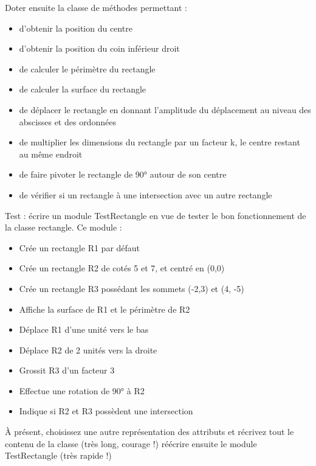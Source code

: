 {
Doter ensuite la classe de méthodes permettant :}

\liststyleListi
\begin{itemize}
\item {
d’obtenir la position du centre}
\item {
d’obtenir la position du coin inférieur droit}
\item {
de calculer le périmètre du rectangle}
\item {
de calculer la surface du rectangle}
\item {
de déplacer le rectangle en donnant l’amplitude du déplacement au niveau
des abscisses et des ordonnées}
\item {
de multiplier les dimensions du rectangle par un facteur k, le centre
restant au même endroit}
\item {
de faire pivoter le rectangle de 90° autour de son centre}
\item {
de vérifier si un rectangle à une intersection avec un autre rectangle}
\end{itemize}
{
Test : écrire un module TestRectangle en vue de tester le bon
fonctionnement de la classe rectangle. Ce module : }

\liststyleListi
\begin{itemize}
\item {
Crée un rectangle R1 par défaut}
\item {
Crée un rectangle R2 de cotés 5 et 7, et centré en (0,0)}
\item {
Crée un rectangle R3 possédant les sommets (-2,3) et (4, -5)}
\item {
Affiche la surface de R1 et le périmètre de R2}
\item {
Déplace R1 d’une unité vers le bas}
\item {
Déplace R2 de 2 unités vers la droite}
\item {
Grossit R3 d’un facteur 3}
\item {
Effectue une rotation de 90° à R2}
\item {
Indique si R2 et R3 possèdent une intersection}
\end{itemize}
{
À présent, choisissez une autre représentation des attributs et récrivez
tout le contenu de la classe (très long, courage !) réécrire ensuite le
module TestRectangle (très rapide !)}

